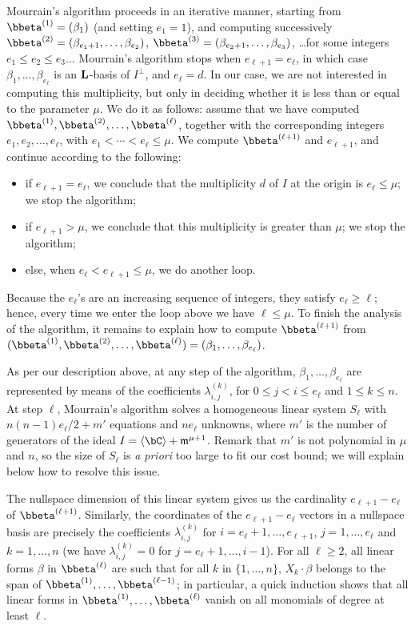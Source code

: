 \documentclass[12pt]{article}
\begin{document}
Mourrain's algorithm proceeds in an iterative manner, starting from
$\bbeta^{(1)}=(\beta_{1})$ (and setting $e_1=1$), and computing
successively $\bbeta^{(2)}=(\beta_{e_1+1},\dots,\beta_{e_2})$,
$\bbeta^{(3)}=(\beta_{e_2+1},\dots,\beta_{e_3})$, \dots for some
integers $e_1 \le e_2 \le e_3 \dots$ Mourrain's algorithm stops when
$e_{\ell+1}=e_{\ell}$, in which case $\beta_1,\dots,\beta_{e_\ell}$ is
an $\mathbf{L}$-basis of $I^\perp$, and $e_\ell=d$. In our case, we
are not interested in computing this multiplicity, but only in
deciding whether it is less than or equal to the parameter $\mu$. We do it as follows: assume that we have
computed $\bbeta^{(1)},\bbeta^{(2)},\dots,\bbeta^{(\ell)}$, together
with the corresponding integers $e_1,e_2,\dots,e_\ell$, with $e_1 <
\cdots < e_\ell \le \mu$. We compute $\bbeta^{(\ell+1)}$ and $e_{\ell+1}$,
and continue according to the following:
\begin{itemize}
\item if $e_{\ell+1}=e_{\ell}$, we conclude that the multiplicity
  $d$ of $I$ at the origin is $e_\ell \le \mu$; we stop the
  algorithm;
\item if $e_{\ell+1} > \mu$, we conclude that this multiplicity is greater 
  than $\mu$; we stop the algorithm;
\item else, when $e_\ell < e_{\ell+1} \le \mu$, we do another loop.
\end{itemize}
Because the $e_\ell$'s are an increasing sequence of integers, they
satisfy $e_\ell \ge \ell$; hence, every time we enter the loop above we
have $\ell \le \mu$. To finish the analysis of the algorithm, it
remains to explain how to compute $\bbeta^{(\ell+1)}$ from
$(\bbeta^{(1)},\bbeta^{(2)},\dots,\bbeta^{(\ell)})=(\beta_{1},\dots,\beta_{e_\ell})$.

As per our description above, at any step of the algorithm,
$\beta_{1},\dots,\beta_{e_\ell}$ are represented by means of the
coefficients $\lambda^{(k)}_{i,j}$, for $0 \le j < i \le e_{\ell}$ and
$1 \le k \le n$.  At step $\ell$, Mourrain's algorithm solves a homogeneous linear system
$S_\ell$ with $n(n-1) e_\ell/2+m'$ equations and $n e_\ell$ unknowns,
where $m'$ is the number of generators of the ideal $I= \langle \bC
\rangle + \m^{\mu+1}$. Remark that $m'$ is not polynomial in $\mu$ 
and $n$, so the size of $S_\ell$ is {\em a priori} too large to 
fit our cost bound; we will explain below how to resolve this issue.

The nullspace dimension of this linear system gives us the cardinality
$e_{\ell+1}-e_{\ell}$ of $\bbeta^{(\ell+1)}$. Similarly, the coordinates of
the $e_{\ell+1}-e_{\ell}$ vectors in a nullspace basis are precisely
the coefficients $\lambda^{(k)}_{i,j}$ for
$i=e_{\ell}+1,\dots,e_{\ell+1}$, $j=1,\dots,e_\ell$ and $k=1,\dots,n$
(we have $\lambda^{(k)}_{i,j}=0$ for $j=e_{\ell}+1,\dots,i-1$). For
all $\ell \ge 2$, all linear forms $\beta$ in $\bbeta^{(\ell)}$ are
such that for all $k$ in $\{1,\dots,n\}$, $X_k \cdot \beta$ belongs to
the span of $\bbeta^{(1)},\dots,\bbeta^{(\ell-1)}$; in particular, a
quick induction shows that all linear forms in
$\bbeta^{(1)},\dots,\bbeta^{(\ell)}$ vanish on all monomials of degree
at least $\ell$.
\end{document}
